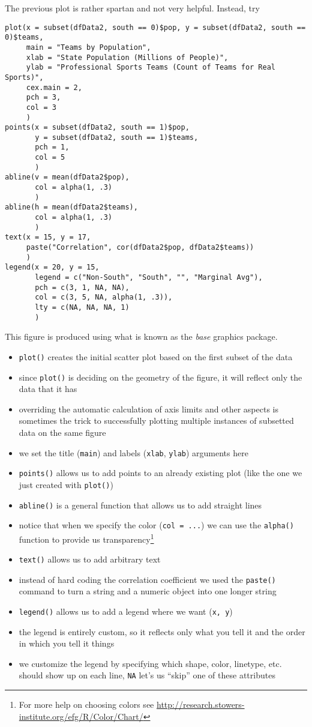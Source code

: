The previous plot is rather spartan and not very helpful. Instead, try
\begin{verbatim}
plot(x = subset(dfData2, south == 0)$pop, y = subset(dfData2, south == 0)$teams,
     main = "Teams by Population",
     xlab = "State Population (Millions of People)",
     ylab = "Professional Sports Teams (Count of Teams for Real Sports)",
     cex.main = 2,
     pch = 3,
     col = 3
     )
points(x = subset(dfData2, south == 1)$pop, 
       y = subset(dfData2, south == 1)$teams,
       pch = 1,
       col = 5
       )
abline(v = mean(dfData2$pop),
       col = alpha(1, .3)
       )
abline(h = mean(dfData2$teams),
       col = alpha(1, .3)
       )
text(x = 15, y = 17,
     paste("Correlation", cor(dfData2$pop, dfData2$teams))
     )
legend(x = 20, y = 15,
       legend = c("Non-South", "South", "", "Marginal Avg"),
       pch = c(3, 1, NA, NA),
       col = c(3, 5, NA, alpha(1, .3)),
       lty = c(NA, NA, NA, 1)
       )
\end{verbatim}
This figure is produced using what is known as the \textit{base}
graphics package.
\begin{itemize}
\item \texttt{plot()} creates the initial scatter plot based on the
  first subset of the data
\item since \texttt{plot()} is deciding on the geometry of the figure,
  it will reflect only the data that it has
\item overriding the automatic calculation of axis limits and other
  aspects is sometimes the trick to successfully plotting multiple
  instances of subsetted data on the same figure
\item we set the title (\texttt{main}) and labels (\texttt{xlab},
  \texttt{ylab}) arguments here
\item \texttt{points()} allows us to add points to an already existing
  plot (like the one we just created with \texttt{plot()})
\item \texttt{abline()} is a general function that allows us to add
  straight lines
\item notice that when we specify the color (\texttt{col = ...}) we
  can use the \texttt{alpha()} function to provide us
  transparency\footnote{For more help on choosing colors see
    \url{http://research.stowers-institute.org/efg/R/Color/Chart/}}
\item \texttt{text()} allows us to add arbitrary text
\item instead of hard coding the correlation coefficient we used the
  \texttt{paste()} command to turn a string and a numeric object into
  one longer string
\item \texttt{legend()} allows us to add a legend where we want
  (\texttt{x, y})
\item the legend is entirely custom, so it reflects only what you tell
  it and the order in which you tell it things
\item we customize the legend by specifying which shape, color,
  linetype, etc. should show up on each line, \texttt{NA} let's us
  ``skip'' one of these attributes
\end{itemize}

